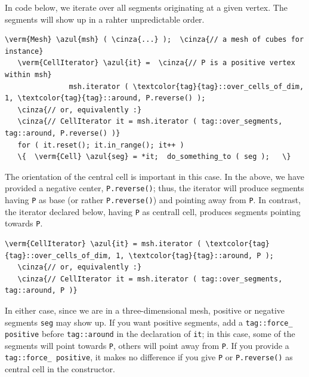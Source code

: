 In code below, we iterate over all segments originating at a given vertex.
The segments will show up in a rahter unpredictable order.

\begin{Verbatim}[commandchars=\\\{\},formatcom=\small\tt,
   baselinestretch=0.94,framesep=2mm                      ]
   \verm{Mesh} \azul{msh} ( \cinza{...} );  \cinza{// a mesh of cubes for instance}
   \verm{CellIterator} \azul{it} =  \cinza{// P is a positive vertex within msh}
               msh.iterator ( \textcolor{tag}{tag}::over_cells_of_dim, 1, \textcolor{tag}{tag}::around, P.reverse() );
   \cinza{// or, equivalently :}
   \cinza{// CellIterator it = msh.iterator ( tag::over_segments, tag::around, P.reverse() )}
   for ( it.reset(); it.in_range(); it++ )
   \{  \verm{Cell} \azul{seg} = *it;  do_something_to ( seg );   \}
\end{Verbatim}

The orientation of the central cell is important in this case.
In the above, we have provided a negative center, {\small\tt P.reverse()};
thus, the iterator will produce segments {\small\tt{}} having {\small\tt P} as base
(or rather {\small\tt P.reverse()}) and pointing away from {\small\tt P}.
In contrast, the iterator declared below, having {\small\tt P} as centrall cell,
produces segments pointing towards {\small\tt P}.

\begin{Verbatim}[commandchars=\\\{\},formatcom=\small\tt,
   baselinestretch=0.94,framesep=2mm                      ]
   \verm{CellIterator} \azul{it} = msh.iterator ( \textcolor{tag}{tag}::over_cells_of_dim, 1, \textcolor{tag}{tag}::around, P );
   \cinza{// or, equivalently :}
   \cinza{// CellIterator it = msh.iterator ( tag::over_segments, tag::around, P )}
\end{Verbatim}

In either case, since we are in a three-dimensional mesh, positive or negative segments
{\small\tt seg} may show up.
If you want positive segments, add a {\small\tt\textcolor{tag}{tag}::force\_\,positive} before
{\small\tt\textcolor{tag}{tag}::around} in the declaration of {\small\tt it};
in this case, some of the segments will point towards {\small\tt P},
others will point away from {\small\tt P}.
If you provide a {\small\tt\textcolor{tag}{tag}::force\_\,positive}, it makes no difference
if you give {\small\tt P} or {\small\tt P.reverse()} as central cell in the constructor.


